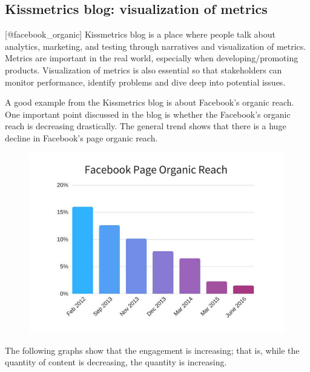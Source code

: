 \documentclass[]{book}
\theoremstyle{definition}
\theoremstyle{definition}
\theoremstyle{definition}
\theoremstyle{remark}
\begin{document}
\subsection{Kissmetrics blog: visualization of
metrics}\label{kissmetrics-blog-visualization-of-metrics}

{[}@facebook\_organic{]} Kissmetrics blog is a place where people talk
about analytics, marketing, and testing through narratives and
visualization of metrics. Metrics are important in the real world,
especially when developing/promoting products. Visualization of metrics
is also essential so that stakeholders can monitor performance, identify
problems and dive deep into potential issues.

A good example from the Kissmetrics blog is about Facebook's organic
reach. One important point discussed in the blog is whether the
Facebook's organic reach is decreasing drastically. The general trend
shows that there is a huge decline in Facebook's page organic reach.

\begin{figure}
\centering
\includegraphics{images/facebook-page-organic-reach-decline-over-years.jpg}
\caption{}
\end{figure}

The following graphs show that the engagement is increasing; that is,
while the quantity of content is decreasing, the quantity is increasing.
\end{document}

